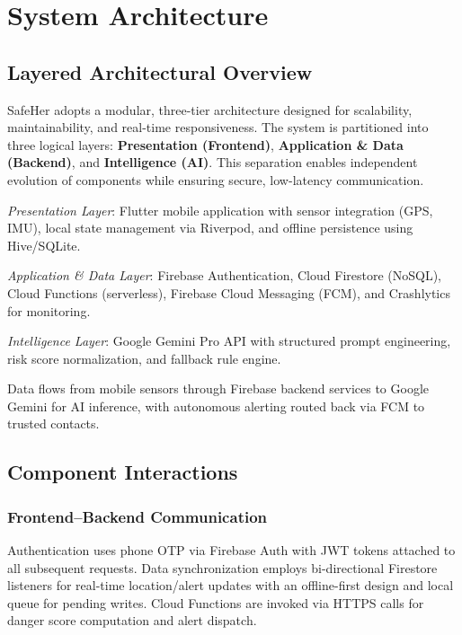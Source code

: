 \section{System Architecture}

\subsection{Layered Architectural Overview}
SafeHer adopts a modular, three-tier architecture designed for scalability, maintainability, and real-time responsiveness. The system is partitioned into three logical layers: \textbf{Presentation (Frontend)}, \textbf{Application \& Data (Backend)}, and \textbf{Intelligence (AI)}. This separation enables independent evolution of components while ensuring secure, low-latency communication.

\textit{Presentation Layer}: Flutter mobile application with sensor integration (GPS, IMU), local state management via Riverpod, and offline persistence using Hive/SQLite.

\textit{Application \& Data Layer}: Firebase Authentication, Cloud Firestore (NoSQL), Cloud Functions (serverless), Firebase Cloud Messaging (FCM), and Crashlytics for monitoring.

\textit{Intelligence Layer}: Google Gemini Pro API with structured prompt engineering, risk score normalization, and fallback rule engine.

Data flows from mobile sensors through Firebase backend services to Google Gemini for AI inference, with autonomous alerting routed back via FCM to trusted contacts.

\subsection{Component Interactions}

\subsubsection{Frontend--Backend Communication}
Authentication uses phone OTP via Firebase Auth with JWT tokens attached to all subsequent requests. Data synchronization employs bi-directional Firestore listeners for real-time location/alert updates with an offline-first design and local queue for pending writes. Cloud Functions are invoked via HTTPS calls for danger score computation and alert dispatch.

